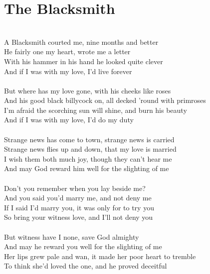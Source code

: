 \documentclass[letterpaper,9pt]{article}
\begin{document}
\newpage
\section{The Blacksmith}
\LARGE
\noindent
\\A Blacksmith courted me, nine months and better
\\He fairly one my heart, wrote me a letter
\\With his hammer in his hand he looked quite clever
\\And if I was with my love, I'd live forever
\\
\\But where has my love gone, with his cheeks like roses
\\And his good black billycock on, all decked 'round with primroses
\\I'm afraid the scorching sun will shine, and burn his beauty
\\And if I was with my love, I'd do my duty
\\
\\Strange news has come to town, strange news is carried
\\Strange news flies up and down, that my love is married
\\I wish them both much joy, though they can't hear me
\\And may God reward him well for the slighting of me
\\
\\Don't you remember when you lay beside me?
\\And you said you'd marry me, and not deny me
\\If I said I'd marry you, it was only for to try you
\\So bring your witness love, and I'll not deny you
\\
\\But witness have I none, save God almighty
\\And may he reward you well for the slighting of me
\\Her lips grew pale and wan, it made her poor heart to tremble
\\To think she'd loved the one, and he proved deceitful

\newpage
\end{document}
